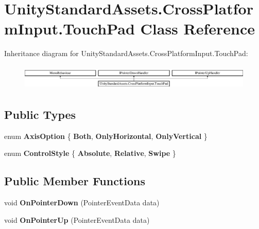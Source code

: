 \hypertarget{class_unity_standard_assets_1_1_cross_platform_input_1_1_touch_pad}{}\section{Unity\+Standard\+Assets.\+Cross\+Platform\+Input.\+Touch\+Pad Class Reference}
\label{class_unity_standard_assets_1_1_cross_platform_input_1_1_touch_pad}
Inheritance diagram for Unity\+Standard\+Assets.\+Cross\+Platform\+Input.\+Touch\+Pad\+:\begin{figure}[H]
\begin{center}
\leavevmode
\includegraphics[height=1.216069cm]{class_unity_standard_assets_1_1_cross_platform_input_1_1_touch_pad}
\end{center}
\end{figure}
\subsection*{Public Types}
\begin{DoxyCompactItemize}
\item 
\mbox{\label{class_unity_standard_assets_1_1_cross_platform_input_1_1_touch_pad_a97d0cfd4e00c26253919746e84ebb7e5}} 
enum {\bfseries Axis\+Option} \{ {\bfseries Both}, 
{\bfseries Only\+Horizontal}, 
{\bfseries Only\+Vertical}
 \}
\item 
\mbox{\label{class_unity_standard_assets_1_1_cross_platform_input_1_1_touch_pad_ab4c68ac6f2b8a41c5029c105833ebfb6}} 
enum {\bfseries Control\+Style} \{ {\bfseries Absolute}, 
{\bfseries Relative}, 
{\bfseries Swipe}
 \}
\end{DoxyCompactItemize}
\subsection*{Public Member Functions}
\begin{DoxyCompactItemize}
\item 
\mbox{\label{class_unity_standard_assets_1_1_cross_platform_input_1_1_touch_pad_a8b4472a5a1e14f366343555bde2a0d5f}} 
void {\bfseries On\+Pointer\+Down} (Pointer\+Event\+Data data)
\item 
\mbox{\label{class_unity_standard_assets_1_1_cross_platform_input_1_1_touch_pad_a4dba9a8b6dfe34618e48f1b152bc1eba}} 
void {\bfseries On\+Pointer\+Up} (Pointer\+Event\+Data data)
\end{DoxyCompactItemize}
